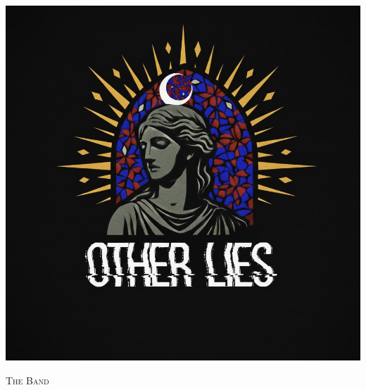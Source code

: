 \begin{titlepage}
  \thispagestyle{empty}
  \setcounter{page}{0}

  \pagecolor{logobg}
  \color{white}

  \maketitle

  \vspace{2cm}

  \centering
  \includegraphics[height=0.5\textheight]{Other-Lies-Logo.png}\\

  \newpage
  \pagecolor{bandbg}
  \color{white}

  \vspace{5em}

  \begin{center}
    {\Huge \sffamily \scshape The Band}\\
  \end{center}

  \vspace{2em}


\end{titlepage}

